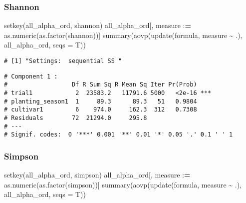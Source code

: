 \documentclass[
]{article}
\newenvironment{Shaded}{\begin{snugshade}}{\end{snugshade}}
\newcommand{\AttributeTok}[1]{\textcolor[rgb]{0.77,0.63,0.00}{#1}}
\newcommand{\ErrorTok}[1]{\textcolor[rgb]{0.64,0.00,0.00}{\textbf{#1}}}
\newcommand{\FunctionTok}[1]{\textcolor[rgb]{0.00,0.00,0.00}{#1}}
\newcommand{\NormalTok}[1]{#1}
\newcommand{\SpecialCharTok}[1]{\textcolor[rgb]{0.00,0.00,0.00}{#1}}
\begin{document}
\hypertarget{shannon-1}{%
\subsubsection{Shannon}\label{shannon-1}}

\begin{Shaded}
\begin{Highlighting}[]
\FunctionTok{setkey}\NormalTok{(all\_alpha\_ord, shannon)}
\NormalTok{all\_alpha\_ord[, measure }\SpecialCharTok{:}\ErrorTok{=} \FunctionTok{as.numeric}\NormalTok{(}\FunctionTok{as.factor}\NormalTok{(shannon))]}
\FunctionTok{summary}\NormalTok{(}\FunctionTok{aovp}\NormalTok{(}\FunctionTok{update}\NormalTok{(formula, measure }\SpecialCharTok{\textasciitilde{}}\NormalTok{ .), all\_alpha\_ord, }\AttributeTok{seqs =}\NormalTok{ T))}
\end{Highlighting}
\end{Shaded}

\begin{verbatim}
# [1] "Settings:  sequential SS "
\end{verbatim}

\begin{verbatim}
# Component 1 :
#                  Df R Sum Sq R Mean Sq Iter Pr(Prob)    
# trial1            2  23583.2   11791.6 5000   <2e-16 ***
# planting_season1  1     89.3      89.3   51   0.9804    
# cultivar1         6    974.0     162.3  312   0.7308    
# Residuals        72  21294.0     295.8                  
# ---
# Signif. codes:  0 '***' 0.001 '**' 0.01 '*' 0.05 '.' 0.1 ' ' 1
\end{verbatim}

\hypertarget{simpson-1}{%
\subsubsection{Simpson}\label{simpson-1}}

\begin{Shaded}
\begin{Highlighting}[]
\FunctionTok{setkey}\NormalTok{(all\_alpha\_ord, simpson)}
\NormalTok{all\_alpha\_ord[, measure }\SpecialCharTok{:}\ErrorTok{=} \FunctionTok{as.numeric}\NormalTok{(}\FunctionTok{as.factor}\NormalTok{(simpson))]}
\FunctionTok{summary}\NormalTok{(}\FunctionTok{aovp}\NormalTok{(}\FunctionTok{update}\NormalTok{(formula, measure }\SpecialCharTok{\textasciitilde{}}\NormalTok{ .), all\_alpha\_ord, }\AttributeTok{seqs =}\NormalTok{ T))}
\end{Highlighting}
\end{Shaded}
\end{document}
